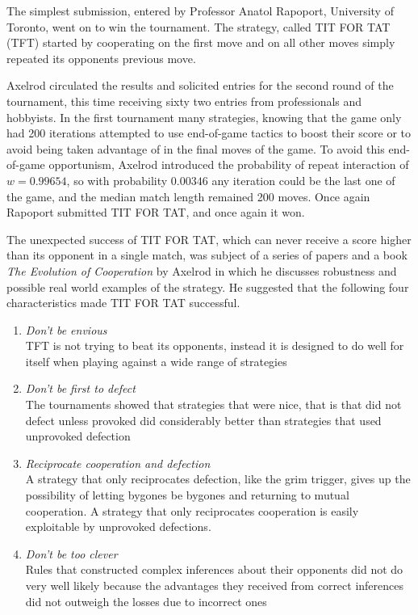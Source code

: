 The simplest submission, entered by Professor Anatol Rapoport, University of Toronto, went on to win the tournament. The strategy, called TIT FOR TAT (TFT) started by cooperating on the first move and on all other moves simply repeated its opponents previous move.

Axelrod circulated the results and solicited entries for the second round of the tournament, this time receiving sixty two entries from professionals and hobbyists. In the first tournament many strategies, knowing that the game only had 200 iterations attempted to use end-of-game tactics to boost their score or to avoid being taken advantage of in the final moves of the game. To avoid this end-of-game opportunism, Axelrod introduced the probability of repeat interaction of $w = 0.99654$, so with probability $0.00346$ any iteration could be the last one of the game, and the median match length remained 200 moves. Once again Rapoport submitted TIT FOR TAT, and once again it won.

The unexpected success of TIT FOR TAT, which can never receive a score higher than its opponent in a single match, was subject of a series of papers and a book \textit{The Evolution of Cooperation} by Axelrod in which he discusses robustness and possible real world examples of the strategy. He suggested that the following four characteristics made TIT FOR TAT successful.
\begin{enumerate}
\item \textit{Don't be envious} \\
TFT is not trying to beat its opponents, instead it is designed to do well for itself when playing against a wide range of strategies
\item \textit{Don't be first to defect} \\
The tournaments showed that strategies that were nice, that is that did not defect unless provoked did considerably better than strategies that used unprovoked defection
\item \textit{Reciprocate cooperation and defection} \\
A strategy that only reciprocates defection, like the grim trigger, gives up the possibility of letting bygones be bygones and returning to mutual cooperation. A strategy that only reciprocates cooperation is easily exploitable by unprovoked defections.
\item \textit{Don't be too clever} \\
Rules that constructed complex inferences about their opponents did not do very well likely because the advantages they received from correct inferences did not outweigh the losses due to incorrect ones
\end{enumerate}


